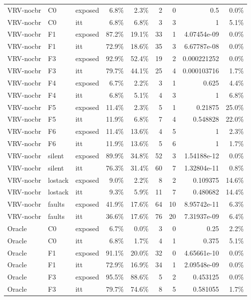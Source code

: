 \begin{tabular}{lllrrrrrr}
VRV-nocbr & C0 & exposed & 6.8\% & 2.3\% & 2 & 0 & 0.5 & 0.0\% \\
VRV-nocbr & C0 & itt & 6.8\% & 6.8\% & 3 & 3 & 1 & 5.1\% \\
VRV-nocbr & F1 & exposed & 87.2\% & 19.1\% & 33 & 1 & 4.07454e-09 & 0.0\% \\
VRV-nocbr & F1 & itt & 72.9\% & 18.6\% & 35 & 3 & 6.67787e-08 & 0.0\% \\
VRV-nocbr & F3 & exposed & 92.9\% & 52.4\% & 19 & 2 & 0.000221252 & 0.0\% \\
VRV-nocbr & F3 & itt & 79.7\% & 44.1\% & 25 & 4 & 0.000103716 & 1.7\% \\
VRV-nocbr & F4 & exposed & 6.7\% & 2.2\% & 3 & 1 & 0.625 & 4.4\% \\
VRV-nocbr & F4 & itt & 6.8\% & 5.1\% & 4 & 3 & 1 & 6.8\% \\
VRV-nocbr & F5 & exposed & 11.4\% & 2.3\% & 5 & 1 & 0.21875 & 25.0\% \\
VRV-nocbr & F5 & itt & 11.9\% & 6.8\% & 7 & 4 & 0.548828 & 22.0\% \\
VRV-nocbr & F6 & exposed & 11.4\% & 13.6\% & 4 & 5 & 1 & 2.3\% \\
VRV-nocbr & F6 & itt & 11.9\% & 13.6\% & 5 & 6 & 1 & 1.7\% \\
VRV-nocbr & silent & exposed & 89.9\% & 34.8\% & 52 & 3 & 1.54188e-12 & 0.0\% \\
VRV-nocbr & silent & itt & 76.3\% & 31.4\% & 60 & 7 & 1.32804e-11 & 0.8\% \\
VRV-nocbr & lostack & exposed & 9.0\% & 2.2\% & 8 & 2 & 0.109375 & 14.6\% \\
VRV-nocbr & lostack & itt & 9.3\% & 5.9\% & 11 & 7 & 0.480682 & 14.4\% \\
VRV-nocbr & faults & exposed & 41.9\% & 17.6\% & 64 & 10 & 8.95742e-11 & 6.3\% \\
VRV-nocbr & faults & itt & 36.6\% & 17.6\% & 76 & 20 & 7.31937e-09 & 6.4\% \\
Oracle & C0 & exposed & 6.7\% & 0.0\% & 3 & 0 & 0.25 & 2.2\% \\
Oracle & C0 & itt & 6.8\% & 1.7\% & 4 & 1 & 0.375 & 5.1\% \\
Oracle & F1 & exposed & 91.1\% & 20.0\% & 32 & 0 & 4.65661e-10 & 0.0\% \\
Oracle & F1 & itt & 72.9\% & 16.9\% & 34 & 1 & 2.09548e-09 & 0.0\% \\
Oracle & F3 & exposed & 95.5\% & 88.6\% & 5 & 2 & 0.453125 & 0.0\% \\
Oracle & F3 & itt & 79.7\% & 74.6\% & 8 & 5 & 0.581055 & 1.7\% \\

\end{tabular}
